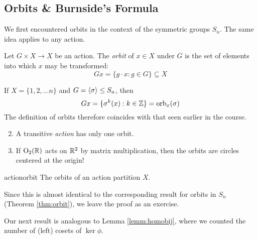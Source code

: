 \clearpage



\subsection{Orbits \& Burnside's Formula}

We first encountered orbits in the context of the symmetric groups $S_n$. The same idea applies to any action.

\begin{defn}{}{}
Let $G\times X\to X$ be an action. The \emph{orbit} of $x\in X$ under $G$ is the set of elements into which $x$ may be transformed:
\[Gx=\{g\cdot x:g\in G\}\subseteq X\]
\end{defn}


\begin{examples}{}{}
\exstart If $X=\{1,2,\ldots n\}$ and $G=\left\langle \sigma\right\rangle\le S_n$, then
\[Gx=\{\sigma^k(x):k\in\mathbb{Z}\}=\mathrm{orb}_x(\sigma)\]
The definition of orbits therefore coincides with that seen earlier in the course.
\begin{enumerate}\setcounter{enumi}{1}
  \item A transitive \emph{action\footnotemark} has only one orbit.
  
  \item If $\mathrm{O}_2(\mathbb{R})$ acts on $\mathbb{R}^2$ by matrix multiplication, then the orbits are circles centered at the origin!
\end{enumerate}
\end{examples}



\begin{lemm}{}{actionorbit}
The orbits of an action partition $X$.
\end{lemm}

Since this is almost identical to the corresponding result for orbits in $S_n$ (Theorem \ref{thm:orbit}), we leave the proof as an exercise.


\smallbreak
Our next result is analogous to Lemma \ref{lemm:homobij}, where we counted the number of (left) cosets of $\ker\phi$.




